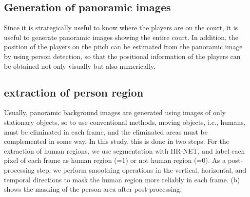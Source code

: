 \subsection{Generation of panoramic images}
Since it is strategically useful to know where the players are on the court, it is useful to generate panoramic images showing the entire court. In addition, the position of the players on the pitch can be estimated from the panoramic image by using person detection, so that the positional information of the players can be obtained not only visually but also numerically.

\subsection{extraction of person region}

Usually, panoramic background images are generated using images of only stationary objects, so to use conventional methods, moving objects, i.e., humans, must be eliminated in each frame, and the eliminated areas must be complemented in some way. In this study, this is done in two steps.
For the extraction of human regions, we use segmentation with HR-NET\cite{SunXLW19}, and label each pixel of each frame as human region (=1) or not human region (=0). As a post-processing step, we perform smoothing operations in the vertical, horizontal, and temporal directions to mask the human region more reliably in each frame. (b) shows the masking of the person area after post-processing.



